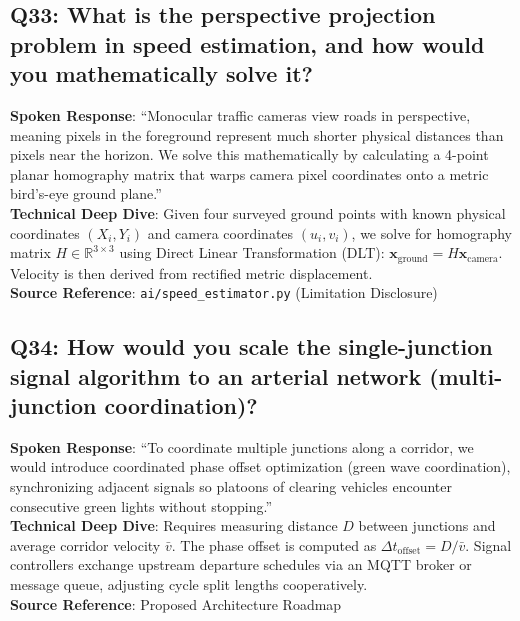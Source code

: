\documentclass[11pt,a4paper,oneside]{report}
\begin{document}
\subsection*{Q33: What is the perspective projection problem in speed estimation, and how would you mathematically solve it?}
\begin{interviewbox}
\textbf{Spoken Response}: ``Monocular traffic cameras view roads in perspective, meaning pixels in the foreground represent much shorter physical distances than pixels near the horizon. We solve this mathematically by calculating a 4-point planar homography matrix that warps camera pixel coordinates onto a metric bird's-eye ground plane.''\\
\textbf{Technical Deep Dive}: Given four surveyed ground points with known physical coordinates $(X_i, Y_i)$ and camera coordinates $(u_i, v_i)$, we solve for homography matrix $H \in \mathbb{R}^{3 \times 3}$ using Direct Linear Transformation (DLT): $\mathbf{x}_{\text{ground}} = H \mathbf{x}_{\text{camera}}$. Velocity is then derived from rectified metric displacement.\\
\textbf{Source Reference}: \texttt{ai/speed\_estimator.py} (Limitation Disclosure)
\end{interviewbox}

\subsection*{Q34: How would you scale the single-junction signal algorithm to an arterial network (multi-junction coordination)?}
\begin{interviewbox}
\textbf{Spoken Response}: ``To coordinate multiple junctions along a corridor, we would introduce coordinated phase offset optimization (green wave coordination), synchronizing adjacent signals so platoons of clearing vehicles encounter consecutive green lights without stopping.''\\
\textbf{Technical Deep Dive}: Requires measuring distance $D$ between junctions and average corridor velocity $\bar{v}$. The phase offset is computed as $\Delta t_{\text{offset}} = D / \bar{v}$. Signal controllers exchange upstream departure schedules via an MQTT broker or message queue, adjusting cycle split lengths cooperatively.\\
\textbf{Source Reference}: Proposed Architecture Roadmap
\end{interviewbox}
\end{document}
